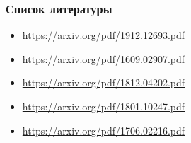 \documentclass{beamer}
\begin{document}
\begin{frame}
\frametitle{Список литературы}
\begin{itemize}
	\item \url{https://arxiv.org/pdf/1912.12693.pdf}
	\item \url{https://arxiv.org/pdf/1609.02907.pdf}
	\item \url{https://arxiv.org/pdf/1812.04202.pdf}
	\item \url{https://arxiv.org/pdf/1801.10247.pdf}
	\item \url{https://arxiv.org/pdf/1706.02216.pdf}
\end{itemize}
\end{frame}










\end{document}
